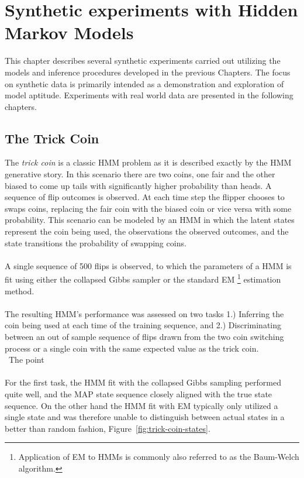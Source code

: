 \documentclass[12pt]{report}
\newcommand{\1}[0]{\mathbbm{1}}
\begin{document}
\chapter{Synthetic experiments with Hidden Markov Models}
\label{chap:Synthetic experiments with Hidden Markov Model}
This chapter describes several synthetic experiments carried out utilizing the models and
inference procedures developed in the previous Chapters. The focus on synthetic data
is primarily intended as a demonstration and exploration of model aptitude. Experiments
with real world data are presented in the following chapters.

\section{The Trick Coin}
The \emph{trick coin} is a classic \ac{HMM} problem as it is described exactly
by the \ac{HMM} generative story. In this scenario there are two coins, one fair
and the other biased to come up tails with significantly higher probability than heads.
A sequence of flip outcomes is observed. At each time step the flipper chooses
to swaps coins, replacing the fair coin with the biased coin or vice versa with some probability.
This scenario can be modeled by an \ac{HMM} in which the latent
states represent the coin being used, the observations the observed outcomes, and
the state transitions the probability of swapping coins.
\\\\
A single sequence of 500 flips is observed, to which the parameters of a \ac{HMM} is fit using
either the collapsed Gibbs sampler or the standard \ac{EM}
\footnote{Application of \ac{EM} to \acp{HMM} is commonly also referred to as
the Baum-Welch algorithm.}
estimation method.
\\\\
The resulting \ac{HMM}'s performance was assessed on two tasks 1.) Inferring
the coin being used at each time of the training sequence, and 2.) Discriminating between an
out of sample sequence of flips drawn from the two coin switching process or a single coin with the
same expected value as the trick coin.
\\\
The point
\\\\
For the first task, the \ac{HMM} fit with the collapsed Gibbs sampling performed quite well,
and the \ac{MAP} state sequence closely aligned with the true state sequence.
On the other hand the \ac{HMM} fit with \ac{EM} typically only utilized a single state
and was therefore unable to distinguish between actual states in a better than random fashion,
Figure~\ref{fig:trick-coin-states}.
\end{document}
